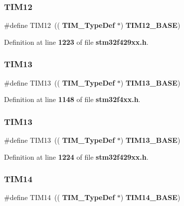 \subsubsection{T\+I\+M12\hspace{0.1cm}{\footnotesize\ttfamily [2/2]}}
{\footnotesize\ttfamily \#define T\+I\+M12~((\textbf{ T\+I\+M\+\_\+\+Type\+Def} $\ast$) \textbf{ T\+I\+M12\+\_\+\+B\+A\+SE})}



Definition at line \textbf{ 1223} of file \textbf{ stm32f429xx.\+h}.

\mbox{\label{group__Peripheral__declaration_ga5a959a833074d59bf6cc7fb437c65b18}} 
\subsubsection{T\+I\+M13\hspace{0.1cm}{\footnotesize\ttfamily [1/2]}}
{\footnotesize\ttfamily \#define T\+I\+M13~((\textbf{ T\+I\+M\+\_\+\+Type\+Def} $\ast$) \textbf{ T\+I\+M13\+\_\+\+B\+A\+SE})}



Definition at line \textbf{ 1148} of file \textbf{ stm32f4xx.\+h}.

\mbox{\label{group__Peripheral__declaration_ga5a959a833074d59bf6cc7fb437c65b18}} 
\subsubsection{T\+I\+M13\hspace{0.1cm}{\footnotesize\ttfamily [2/2]}}
{\footnotesize\ttfamily \#define T\+I\+M13~((\textbf{ T\+I\+M\+\_\+\+Type\+Def} $\ast$) \textbf{ T\+I\+M13\+\_\+\+B\+A\+SE})}



Definition at line \textbf{ 1224} of file \textbf{ stm32f429xx.\+h}.

\mbox{\label{group__Peripheral__declaration_ga2dd30f46fad69dd73e1d8941a43daffe}} 
\subsubsection{T\+I\+M14\hspace{0.1cm}{\footnotesize\ttfamily [1/2]}}
{\footnotesize\ttfamily \#define T\+I\+M14~((\textbf{ T\+I\+M\+\_\+\+Type\+Def} $\ast$) \textbf{ T\+I\+M14\+\_\+\+B\+A\+SE})}



